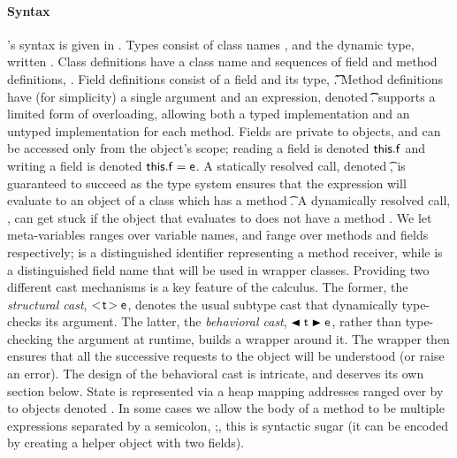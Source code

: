 \documentclass[a4paper,USenglish]{tex/lipics-v2016}
\begin{document}
\paragraph{Syntax}  
\kafka's syntax is given in .  Types consist of class names \C,
\D and the dynamic type, written \any.  Class definitions have a class name
and sequences of field and method definitions,
\Class{}. Field definitions consist of a field and its
type, \Fdef\f\t. Method definitions have (for simplicity) a single argument
and an expression, denoted \Mdef\m\x\t\t\e.  \kafka supports a limited form
of overloading, allowing both a typed implementation and an untyped
implementation for each method.  Fields are private to objects, and can be
accessed only from the object's scope; reading a field is denoted
\(\FRead\f\) and writing a field is denoted \(\FWrite\f\e \).  A statically
resolved call, denoted \KCall\e\m\ep\t\tp, is guaranteed to succeed as the
type system ensures that the expression \e will evaluate to an object of a
class which has a method \Mtype\m\t\tp. A dynamically resolved call,
\DynCall\e\m\ep, can get stuck if the object that \e evaluates to does not
have a method \Mtype\m\any\any.  We let meta-variables \x ranges over
variable names, \m and \f range over methods and fields respectively; \this
is a distinguished identifier representing a method receiver, while \that is
a distinguished field name that will be used in wrapper classes.  Providing
two different cast mechanisms is a key feature of the calculus.  The former,
the \emph{structural cast}, \(\SubCast\t\e\), denotes the usual subtype cast
that dynamically type-checks its argument.  The latter, the \emph{behavioral
  cast}, \(\BehCast\t\e\), rather than type-checking the argument at
runtime, builds a wrapper around it.  The wrapper then ensures that all the
successive requests to the object will be understood (or raise an
error). The design of the behavioral cast is intricate, and deserves its own
section below.  State is represented via a heap \s mapping addresses ranged
over by \a to objects denoted \hspace{-1mm}\obj{}. In some cases
we allow the body of a method to be multiple expressions separated by
a semicolon, \e;\e, this is syntactic sugar (it can be encoded by creating
a helper object with two fields).
\end{document}

